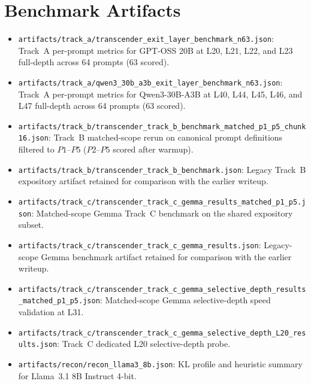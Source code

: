 \documentclass[11pt]{article}
\begin{document}
\section{Benchmark Artifacts}
\label{app:artifacts}

{\small
\begin{itemize}
\item \texttt{artifacts/track\_a/transcender\_exit\_layer\_benchmark\_n63.json}:
  Track~A per-prompt metrics for GPT-OSS 20B at L20, L21, L22, and L23 full-depth across 64 prompts (63 scored).

\item \texttt{artifacts/track\_a/qwen3\_30b\_a3b\_exit\_layer\_benchmark\_n63.json}:
  Track~A per-prompt metrics for Qwen3-30B-A3B at L40, L44, L45, L46, and L47 full-depth across 64 prompts (63 scored).

\item \texttt{artifacts/track\_b/transcender\_track\_b\_benchmark\_matched\_p1\_p5\_chunk16.json}:
  Track~B matched-scope rerun on canonical prompt definitions filtered to $P1$--$P5$ ($P2$--$P5$ scored after warmup).

\item \texttt{artifacts/track\_b/transcender\_track\_b\_benchmark.json}:
  Legacy Track~B expository artifact retained for comparison with the earlier writeup.

\item \texttt{artifacts/track\_c/transcender\_track\_c\_gemma\_results\_matched\_p1\_p5.json}:
  Matched-scope Gemma Track~C benchmark on the shared expository subset.

\item \texttt{artifacts/track\_c/transcender\_track\_c\_gemma\_results.json}:
  Legacy-scope Gemma benchmark artifact retained for comparison with the earlier writeup.

\item \texttt{artifacts/track\_c/transcender\_track\_c\_gemma\_selective\_depth\_results\_matched\_p1\_p5.json}:
  Matched-scope Gemma selective-depth speed validation at L31.

\item \texttt{artifacts/track\_c/transcender\_track\_c\_gemma\_selective\_depth\_L20\_results.json}:
  Track~C dedicated L20 selective-depth probe.

\item \texttt{artifacts/recon/recon\_llama3\_8b.json}:
  KL profile and heuristic summary for Llama~3.1 8B Instruct 4-bit.


\end{itemize}}
\end{document}
